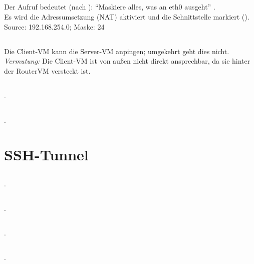 \documentclass[twoside]{article}
\newcommand{\say}[1]{%
	``#1''%
}
\begin{document}
	\subsection{}
	\label{ssec:3.1}
	Der Aufruf bedeutet (nach \cite{nat}): \say{Maskiere alles, was an eth0 ausgeht}.\\
	Es wird die Adressumsetzung (NAT) aktiviert und die Schnittstelle markiert (\cite{ubuntu:nat}).\\
	Source: 192.168.254.0; Maske: 24
	\subsection{}
	\label{ssec:3.2}
	Die Client-VM kann die Server-VM anpingen; umgekehrt geht dies nicht.\\
	\textit{Vermutung:} Die Client-VM ist von außen nicht direkt ansprechbar, da sie hinter der RouterVM versteckt ist.
	\subsection{}
	\label{ssec:3.3}
	\subsection{}
	\label{ssec:3.4}
	\subsection{}.
	\label{ssec:3.5}
	\subsection{}.
	\label{ssec:3.6}

\section{SSH-Tunnel}
\label{sec:ssh-tunnel}
	\subsection{}.
	\label{ssec:4.1}
	\subsection{}.
	\label{ssec:4.2}
	\subsection{}.
	\label{ssec:4.3}
	\subsection{}.
	\label{ssec:4.4}
	
\end{document}
